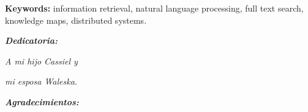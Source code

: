 \textbf{Keywords:} information retrieval, natural language processing, full text search, knowledge maps, distributed systems.


\thispagestyle{empty}




\setlength{\abovedisplayskip}{-5pt}
\setlength{\abovedisplayshortskip}{-5pt}
\thispagestyle{empty}

\newpage
\begin{center}
\large{\textbf{\emph{\Huge{Dedicatoria:}}}}
\end{center}
\thispagestyle{empty}
\vspace*{5cm}
\thispagestyle{empty}
\begin{center} \Large \emph{A  mi hijo Cassiel y  } \end{center}
\vspace*{1cm}
\begin{center} \Large \emph{mi esposa Waleska.} \end{center}



\newpage
\begin{center}
\large{\textbf{\emph{\Huge{Agradecimientos:}}}}
\end{center}
\thispagestyle{empty}
\vspace*{2cm}
\thispagestyle{empty}

